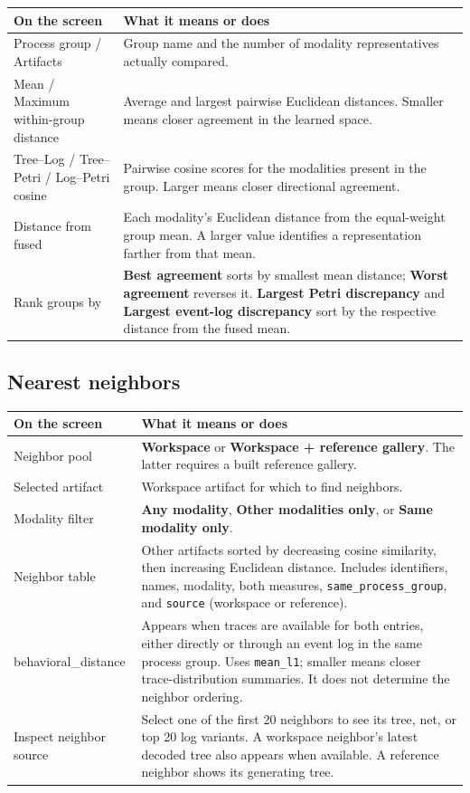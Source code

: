 \documentclass[11pt,a4paper]{article}
\makeatletter
\newcommand{\ui}[1]{\textbf{#1}}
\newcommand{\code}[1]{\nolinkurl{#1}}
\newenvironment{controls}{%
  \small\begin{longtable}{@{}>{\raggedright\arraybackslash}p{.34\linewidth}
    >{\raggedright\arraybackslash}p{.62\linewidth}@{}}
  \toprule\textbf{On the screen} & \textbf{What it means or does}\\\midrule\endhead
  \bottomrule\endfoot
}{\end{longtable}\normalsize}
\makeatother
\begin{document}
\begin{controls}
Process group / Artifacts & Group name and the number of modality
representatives actually compared.\\
Mean / Maximum within-group distance & Average and largest pairwise
Euclidean distances. Smaller means closer agreement in the learned space.\\
Tree--Log / Tree--Petri / Log--Petri cosine & Pairwise cosine scores for the
modalities present in the group. Larger means closer directional agreement.\\
Distance from fused & Each modality's Euclidean distance from the equal-weight
group mean. A larger value identifies a representation farther from that mean.\\
Rank groups by & \ui{Best agreement} sorts by smallest mean distance;
\ui{Worst agreement} reverses it. \ui{Largest Petri discrepancy} and
\ui{Largest event-log discrepancy} sort by the respective distance from the
fused mean.\\
\end{controls}

\subsection{Nearest neighbors}
\begin{controls}
Neighbor pool & \ui{Workspace} or \ui{Workspace + reference gallery}.
The latter requires a built reference gallery.\\
Selected artifact & Workspace artifact for which to find neighbors.\\
Modality filter & \ui{Any modality}, \ui{Other modalities only}, or
\ui{Same modality only}.\\
Neighbor table & Other artifacts sorted by decreasing cosine similarity,
then increasing Euclidean distance. Includes identifiers, names, modality,
both measures, \code{same_process_group}, and \code{source}
(workspace or reference).\\
behavioral\_distance & Appears when traces are available for both entries,
either directly or through an event log in the same process group. Uses
\code{mean_l1}; smaller means closer trace-distribution summaries. It does
not determine the neighbor ordering.\\
Inspect neighbor source & Select one of the first 20 neighbors to see its
tree, net, or top 20 log variants. A workspace neighbor's latest decoded tree
also appears when available. A reference neighbor shows its generating tree.\\
\end{controls}
\end{document}
